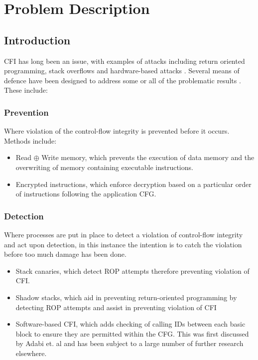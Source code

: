 \section{Problem Description}
\subsection{Introduction}

CFI has long been an issue, with examples of attacks including return oriented programming, stack overflows and hardware-based attacks . Several means of defence have been designed to address some or all of the problematic results . These include:

\subsubsection{Prevention}
Where violation of the control-flow integrity is prevented before it occurs. Methods include:
\begin{itemize}
	\item Read $\oplus$ Write memory, which prevents the execution of data memory and the overwriting of memory containing executable instructions.
	\item Encrypted instructions, which enforce decryption based on a particular order of instructions following the application CFG.
\end{itemize}

\subsubsection{Detection}
Where processes are put in place to detect a violation of control-flow integrity and act upon detection, in this instance the intention is to catch the violation before too much damage has been done.
\begin{itemize}
	\item Stack canaries, which detect ROP attempts therefore preventing violation of CFI.
	\item Shadow stacks, which aid in preventing return-oriented programming by detecting ROP attempts and assist in preventing violation of CFI
	\item Software-based CFI, which adds checking of calling IDs between each basic block to ensure they are permitted within the CFG. This was first discussed by Adabi et. al \cite{Abadi2005} and has been subject to a large number of further research elsewhere.
\end{itemize}

